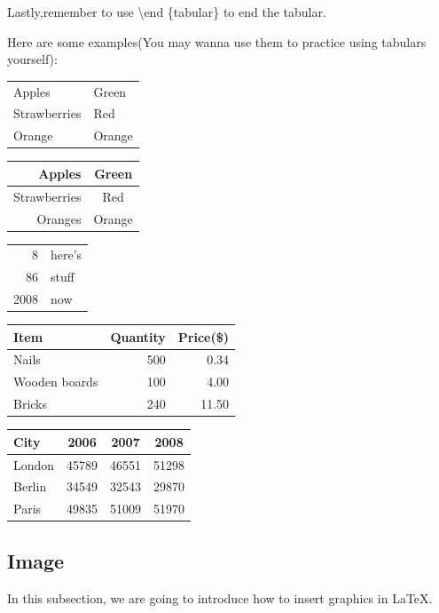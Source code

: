 \documentclass[a4paper,12pt]{article}
\begin{document}
Lastly,remember to use \textbackslash end \{tabular\} to end the tabular.

Here are some examples(You may wanna use 
them to practice using tabulars yourself):

    \begin{tabular}{|l|l|}
    Apples & Green \\
    Strawberries & Red \\
    Orange & Orange\\
    \end{tabular}
    \hspace{20pt}
    \begin{tabular}{r|c}
    Apples & Green\\
    \hline 
    Strawberries & Red \\
    \cline{1-1}
    Oranges & Orange \\
    \end{tabular}

    \vspace{12pt}
    \begin{tabular}{|r|l|}
    \hline
    8 & here's \\
    \cline{2-2}
    86 & stuff\\
    \hline \hline 
    2008 & now \\
    \hline 
    \end{tabular}
    \hspace{20pt}
    \begin{tabular}{l|r|r}
        Item & Quantity & Price(\$) \\
        \hline
        Nails & 500 & 0.34 \\
        Wooden boards & 100 & 4.00 \\
        Bricks & 240 & 11.50
    \end{tabular}

    \vspace{20pt}
    \begin{tabular}{|l|c|c|c|}
        \hline
        City & 2006 & 2007 & 2008 \\
        \hline
        London & 45789 & 46551 & 51298 \\
        Berlin & 34549 & 32543 & 29870 \\
        Paris & 49835 & 51009 & 51970 \\
        \hline
    \end{tabular}
    \subsection{Image}
    In this subsection, we are going to introduce
    how to insert graphics in \LaTeX.
\end{document}
